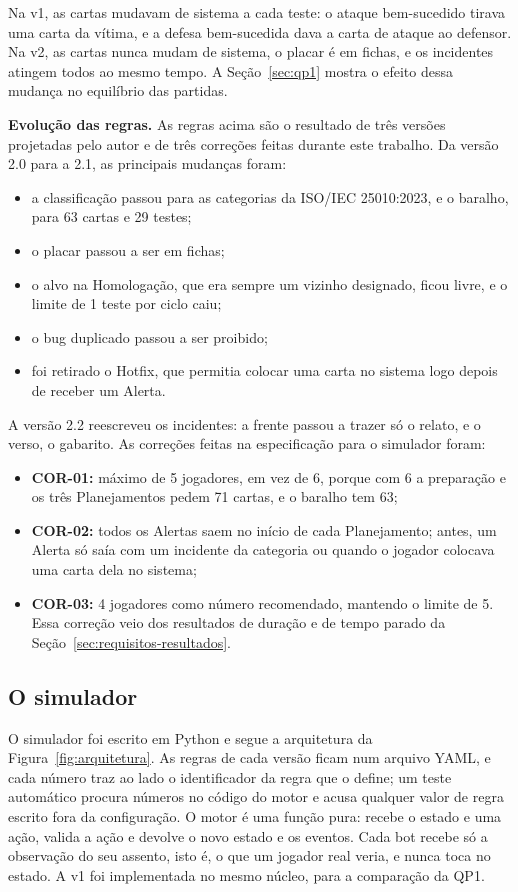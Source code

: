 Na v1, as cartas mudavam de sistema a cada teste: o ataque bem-sucedido tirava uma carta da vítima, e a defesa
bem-sucedida dava a carta de ataque ao defensor. Na v2, as cartas nunca mudam de sistema, o placar é em fichas, e
os incidentes atingem todos ao mesmo tempo. A Seção~\ref{sec:qp1} mostra o efeito dessa mudança no equilíbrio
das partidas.

\textbf{Evolução das regras.} As regras acima são o resultado de três versões projetadas pelo autor e de três
correções feitas durante este trabalho. Da versão 2.0 para a 2.1, as principais mudanças foram:
\begin{itemize}
  \item a classificação passou para as categorias da ISO/IEC 25010:2023, e o baralho, para 63 cartas e 29 testes;
  \item o placar passou a ser em fichas;
  \item o alvo na Homologação, que era sempre um vizinho designado, ficou livre, e o limite de 1 teste por ciclo
    caiu;
  \item o bug duplicado passou a ser proibido;
  \item foi retirado o Hotfix, que permitia colocar uma carta no sistema logo depois de receber um Alerta.
\end{itemize}
A versão 2.2 reescreveu os incidentes: a frente passou a trazer só o relato, e o verso, o gabarito. As correções
feitas na especificação para o simulador foram:
\begin{itemize}
  \item \textbf{COR-01:} máximo de 5 jogadores, em vez de 6, porque com 6 a preparação e os três Planejamentos
    pedem 71 cartas, e o baralho tem 63;
  \item \textbf{COR-02:} todos os Alertas saem no início de cada Planejamento; antes, um Alerta só saía com um
    incidente da categoria ou quando o jogador colocava uma carta dela no sistema;
  \item \textbf{COR-03:} 4 jogadores como número recomendado, mantendo o limite de 5. Essa correção veio dos
    resultados de duração e de tempo parado da Seção~\ref{sec:requisitos-resultados}.
\end{itemize}

\subsection{O simulador}
\label{sec:simulador}

O simulador foi escrito em Python e segue a arquitetura da Figura~\ref{fig:arquitetura}. As regras de cada versão
ficam num arquivo YAML, e cada número traz ao lado o identificador da regra que o define; um teste automático
procura números no código do motor e acusa qualquer valor de regra escrito fora da configuração. O motor é uma
função pura: recebe o estado e uma ação, valida a ação e devolve o novo estado e os eventos. Cada bot recebe só a
observação do seu assento, isto é, o que um jogador real veria, e nunca toca no estado. A v1 foi implementada no
mesmo núcleo, para a comparação da QP1.

